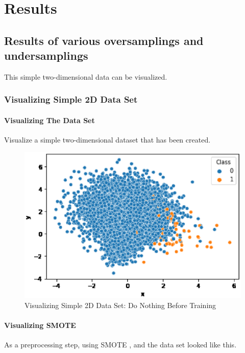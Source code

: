 \chapter{Results}


\section{Results of various oversamplings and undersamplings}
This simple two-dimensional data can be visualized. 

\subsection{Visualizing Simple 2D Data Set}
\subsubsection{Visualizing The Data Set}
Visualize a simple two-dimensional dataset that has been created.

\begin{center}
    \begin{figure}[ht]
        \caption{Visualizing Simple 2D Data Set: Do Nothing Before Training}
        \label{tab:team-rating-features}
        \begin{center}
            \includegraphics[scale=0.6]{image/no-prepro.eps}
        \end{center}
    \end{figure}
\end{center}

\clearpage
\subsubsection{Visualizing SMOTE}
As a preprocessing step, using SMOTE , and the data set looked like this.

